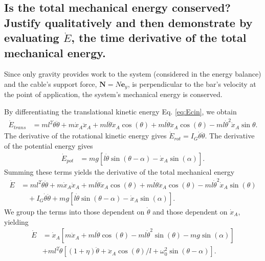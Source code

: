 \documentclass[11pt,a4paper]{exam}
\newcommand{\eyACDH}{\bm e_y}
\begin{document}
\begin{parts}
\part{Is the total mechanical energy conserved? Justify qualitatively and then demonstrate by evaluating $\dot E$, the time derivative of the total mechanical energy.}
    \par\vspace{2mm}
    Since only gravity provides work to the system (considered in the energy balance) and the cable's support force, $\bm N=N\eyACDH$, is perpendicular to the bar's velocity at the point of application, the system's mechanical energy is conserved.
    \par\vspace{2mm}
    By differentiating the translational kinetic energy Eq. \eqref{eq:Ecin}, we obtain
    \begin{align}
        \dot E_{trans}&= ml^2\dot\theta\ddot\theta + m\dot x_A \ddot x_A +ml\ddot\theta \dot x_A \cos(\theta) + ml\dot\theta \ddot x_A \cos(\theta) - ml\dot\theta^2 \dot x_A \sin \theta.
    \end{align}
    The derivative of the rotational kinetic energy gives $\dot E_{rot}=I_G\dot\theta\ddot \theta$.
    The derivative of the potential energy gives
    \begin{align}
        \dot E_{pot} &= mg\left[l\dot\theta \sin(\theta-\alpha) - \dot x_A\sin(\alpha)\right].
    \end{align}
    Summing these terms yields the derivative of the total mechanical energy
    \begin{align}
        \dot E &= ml^2\dot\theta\ddot\theta + m\dot x_A \ddot x_A +ml\ddot\theta \dot x_A \cos(\theta) + ml\dot\theta \ddot x_A \cos(\theta) - ml\dot\theta^2 \dot x_A \sin(\theta) \nonumber\\
        &\quad + I_G\dot\theta\ddot \theta + mg\left[l\dot\theta \sin(\theta-\alpha) - \dot x_A\sin(\alpha)\right].
    \end{align}
    We group the terms into those dependent on $\dot\theta$ and those dependent on $\dot x_A$, yielding
    \begin{align}
        \dot E &= \dot x_A \left[m\ddot x_A +ml\ddot\theta \cos(\theta) - ml\dot\theta^2 \sin(\theta) - mg\sin(\alpha)\right]\nonumber\\
        &+ ml^2 \dot \theta \left[(1+\eta)\ddot\theta + \ddot x_A \cos(\theta)/l + \omega_0^2\sin(\theta-\alpha)\right].

\end{align}
\end{parts}
\end{document}
